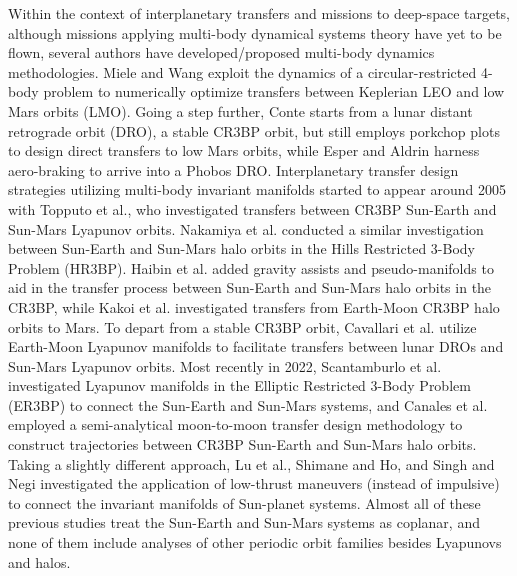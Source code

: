 Within the context of interplanetary transfers and missions to deep-space targets, although
missions applying multi-body dynamical systems theory have yet to be flown, several authors have
developed/proposed multi-body dynamics methodologies. Miele and Wang exploit the dynamics of a
circular-restricted 4-body problem to numerically optimize transfers between Keplerian LEO and low
Mars orbits (LMO)\cite{Miele:1999}. Going a step further, Conte starts from a lunar distant
retrograde orbit (DRO), a stable CR3BP orbit, but still employs porkchop plots to design direct
transfers to low Mars orbits\cite{Conte:2017}, while Esper and Aldrin harness aero-braking to
arrive into a Phobos DRO\cite{Esper:2019}. Interplanetary transfer design strategies utilizing
multi-body invariant manifolds started to appear around 2005 with Topputo et al., who investigated
transfers between CR3BP Sun-Earth and Sun-Mars Lyapunov orbits\cite{Topputo:2005}. Nakamiya et al.
conducted a similar investigation between Sun-Earth and Sun-Mars halo orbits in the Hills
Restricted 3-Body Problem (HR3BP)\cite{Nakamiya:2010}. Haibin et al. added gravity assists and
pseudo-manifolds to aid in the transfer process between Sun-Earth and Sun-Mars halo orbits in the
CR3BP\cite{Haibin:2014}, while Kakoi et al. investigated transfers from Earth-Moon CR3BP halo
orbits to Mars\cite{Kakoi:2014}. To depart from a stable CR3BP orbit, Cavallari et al. utilize
Earth-Moon Lyapunov manifolds to facilitate transfers between lunar DROs and Sun-Mars Lyapunov
orbits\cite{Cavallari:2019}. Most recently in 2022, Scantamburlo et al. investigated Lyapunov
manifolds in the Elliptic Restricted 3-Body Problem (ER3BP) to connect the Sun-Earth and Sun-Mars
systems\cite{Scantamburlo:2022}, and Canales et al. employed a semi-analytical moon-to-moon
transfer design methodology to construct trajectories between CR3BP Sun-Earth and Sun-Mars halo
orbits\cite{Canales:2021a,Canales:2022}. Taking a slightly different approach, Lu et
al.\cite{Lu:2015}, Shimane and Ho\cite{Shimane:2022}, and Singh and Negi\cite{Singh:2024}
investigated the application of low-thrust maneuvers (instead of impulsive) to connect the
invariant manifolds of Sun-planet systems. Almost all of these previous studies treat the Sun-Earth
and Sun-Mars systems as coplanar, and none of them include analyses of other periodic orbit
families besides Lyapunovs and halos.

